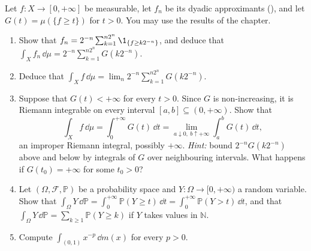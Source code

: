 \begin{exercise}\label{ex:in-layer-cake}
\hard Let $f:X\to[0,+\infty]$ be measurable, let $f_n$ be its dyadic approximants
(), and let $G(t)=\mu(\{f\ge t\})$ for $t>0$. You may use the results of
the chapter.
\begin{enumerate}[label=(\alph*)]
  \item Show that $f_n=2^{-n}\sum_{k=1}^{n2^n}\1_{\{f\ge k2^{-n}\}}$, and deduce that
    $\int_Xf_n\,\dd\mu=2^{-n}\sum_{k=1}^{n2^n}G(k2^{-n})$.
  \item Deduce that $\int_Xf\,\dd\mu=\lim_n2^{-n}\sum_{k=1}^{n2^n}G(k2^{-n})$.
  \item Suppose that $G(t)<+\infty$ for every $t>0$. Since $G$ is non-increasing, it is Riemann
    integrable on every interval $[a,b]\subseteq(0,+\infty)$. Show that
    \[
      \int_Xf\,\dd\mu=\int_0^{+\infty}G(t)\,\dd t=\lim_{a\downarrow0,\ b\uparrow+\infty}\int_a^bG(t)\,\dd t,
    \]
    an improper Riemann integral, possibly $+\infty$. \emph{Hint:} bound $2^{-n}G(k2^{-n})$ above
    and below by integrals of $G$ over neighbouring intervals. What happens if
    $G(t_0)=+\infty$ for some $t_0>0$?
  \item Let $(\Omega,\mathcal F,\mathbb P)$ be a probability space and $Y:\Omega\to[0,+\infty)$ a
    random variable. Show that
    $\int_\Omega Y\,\dd\mathbb P=\int_0^{+\infty}\mathbb P(Y\ge t)\,\dd t=\int_0^{+\infty}\mathbb P(Y>t)\,\dd t$,
    and that $\int_\Omega Y\,\dd\mathbb P=\sum_{k\ge1}\mathbb P(Y\ge k)$ if $Y$ takes values in
    $\mathbb N$.
  \item Compute $\int_{(0,1)}x^{-p}\,\dd m(x)$ for every $p>0$.
\end{enumerate}
\end{exercise}

